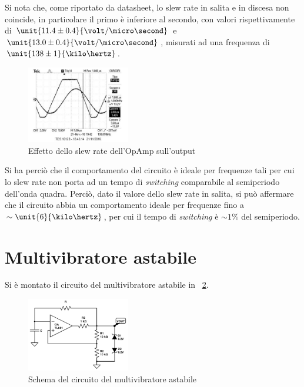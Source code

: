 \documentclass[10pt,a4paper]{article}
\begin{document}
Si nota che, come riportato da datasheet, lo slew rate in salita e in discesa non coincide, in particolare il primo è inferiore al secondo, con valori rispettivamente di $\unit{11.4 \pm 0.4}{\volt/\micro\second}$ e $\unit{13.0 \pm 0.4}{\volt/\micro\second}$, misurati ad una frequenza di $\unit{138 \pm 1}{\kilo\hertz}$.

\begin{figure}[H]
	\centering
	\includegraphics[width=0.40\textwidth]{../oscilloscopio/schmitt_slewrate.jpg}
	\caption{Effetto dello slew rate dell'OpAmp sull'output}
	\label{fig:slew_rate}
\end{figure}

Si ha perciò che il comportamento del circuito è ideale per frequenze tali per cui lo slew rate non porta ad un tempo di \emph{switching} comparabile al semiperiodo dell'onda quadra. Perciò, dato il valore dello slew rate in salita, si può affermare che il circuito abbia un comportamento ideale per frequenze fino a $\sim \unit{6}{\kilo\hertz}$, per cui il tempo di \emph{switching} è $\sim 1\%$ del semiperiodo.


\section{Multivibratore astabile}
Si è montato il circuito del multivibratore astabile in \figurename{~\ref{fig:multivibratore}}.

\begin{figure}[H]
	\centering
	\includegraphics[width=0.40\textwidth]{../circuiti/multivibratore.jpg}
	\caption{Schema del circuito del multivibratore astabile}
	\label{fig:multivibratore}
\end{figure}
\end{document}
